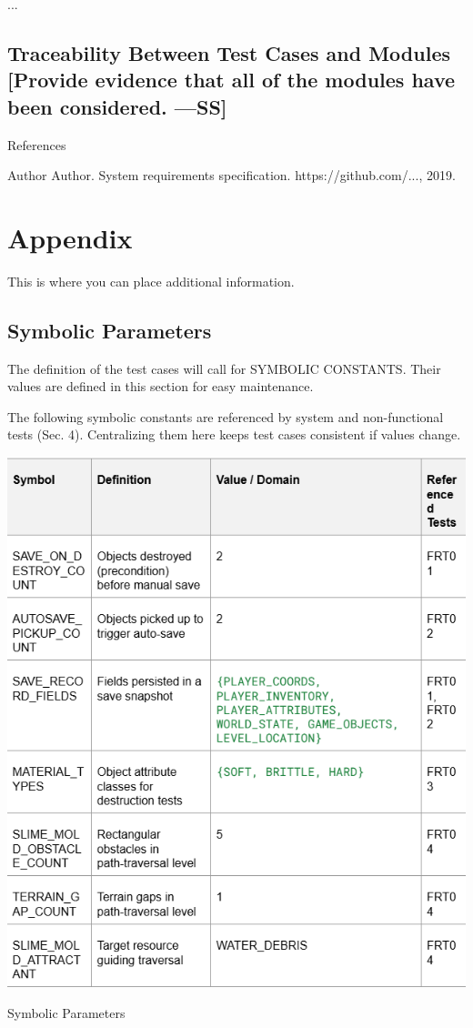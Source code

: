 \documentclass[12pt, titlepage]{article}
\begin{document}
...

\subsection{Traceability Between Test Cases and Modules [Provide evidence that all of the modules have been considered. —SS]}

References

Author Author. System requirements specification. https://github.com/..., 2019.

\section{Appendix}

This is where you can place additional information.

\subsection{Symbolic Parameters}

The definition of the test cases will call for SYMBOLIC CONSTANTS. Their values are defined in this section for easy maintenance.

The following symbolic constants are referenced by system and non-functional tests (Sec. 4). Centralizing them here keeps test cases consistent if values change.

\begin{table}[H]
\centering
\includegraphics[width=\linewidth, height=0.8\textheight, keepaspectratio]{table.png}
\caption{Symbolic Parameters}
\label{tab:symbolic-parameters}
\end{table}
\FloatBarrier %
\end{document}
